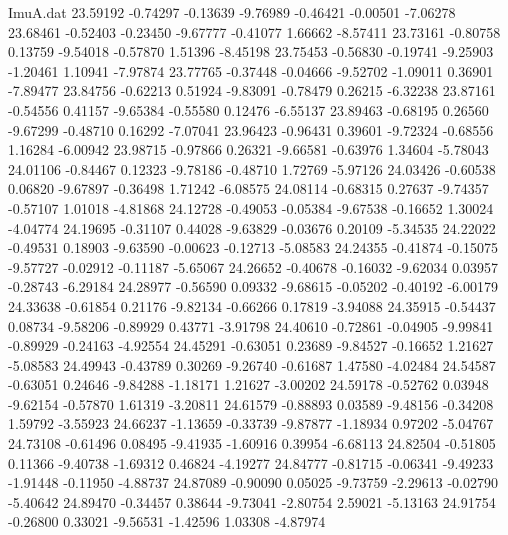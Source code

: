 \begin{filecontents}{ImuA.dat}
  23.59192   -0.74297   -0.13639   -9.76989   -0.46421   -0.00501   -7.06278
  23.68461   -0.52403   -0.23450   -9.67777   -0.41077    1.66662   -8.57411
  23.73161   -0.80758    0.13759   -9.54018   -0.57870    1.51396   -8.45198
  23.75453   -0.56830   -0.19741   -9.25903   -1.20461    1.10941   -7.97874
  23.77765   -0.37448   -0.04666   -9.52702   -1.09011    0.36901   -7.89477
  23.84756   -0.62213    0.51924   -9.83091   -0.78479    0.26215   -6.32238
  23.87161   -0.54556    0.41157   -9.65384   -0.55580    0.12476   -6.55137
  23.89463   -0.68195    0.26560   -9.67299   -0.48710    0.16292   -7.07041
  23.96423   -0.96431    0.39601   -9.72324   -0.68556    1.16284   -6.00942
  23.98715   -0.97866    0.26321   -9.66581   -0.63976    1.34604   -5.78043
  24.01106   -0.84467    0.12323   -9.78186   -0.48710    1.72769   -5.97126
  24.03426   -0.60538    0.06820   -9.67897   -0.36498    1.71242   -6.08575
  24.08114   -0.68315    0.27637   -9.74357   -0.57107    1.01018   -4.81868
  24.12728   -0.49053   -0.05384   -9.67538   -0.16652    1.30024   -4.04774
  24.19695   -0.31107    0.44028   -9.63829   -0.03676    0.20109   -5.34535
  24.22022   -0.49531    0.18903   -9.63590   -0.00623   -0.12713   -5.08583
  24.24355   -0.41874   -0.15075   -9.57727   -0.02912   -0.11187   -5.65067
  24.26652   -0.40678   -0.16032   -9.62034    0.03957   -0.28743   -6.29184
  24.28977   -0.56590    0.09332   -9.68615   -0.05202   -0.40192   -6.00179
  24.33638   -0.61854    0.21176   -9.82134   -0.66266    0.17819   -3.94088
  24.35915   -0.54437    0.08734   -9.58206   -0.89929    0.43771   -3.91798
  24.40610   -0.72861   -0.04905   -9.99841   -0.89929   -0.24163   -4.92554
  24.45291   -0.63051    0.23689   -9.84527   -0.16652    1.21627   -5.08583
  24.49943   -0.43789    0.30269   -9.26740   -0.61687    1.47580   -4.02484
  24.54587   -0.63051    0.24646   -9.84288   -1.18171    1.21627   -3.00202
  24.59178   -0.52762    0.03948   -9.62154   -0.57870    1.61319   -3.20811
  24.61579   -0.88893    0.03589   -9.48156   -0.34208    1.59792   -3.55923
  24.66237   -1.13659   -0.33739   -9.87877   -1.18934    0.97202   -5.04767
  24.73108   -0.61496    0.08495   -9.41935   -1.60916    0.39954   -6.68113
  24.82504   -0.51805    0.11366   -9.40738   -1.69312    0.46824   -4.19277
  24.84777   -0.81715   -0.06341   -9.49233   -1.91448   -0.11950   -4.88737
  24.87089   -0.90090    0.05025   -9.73759   -2.29613   -0.02790   -5.40642
  24.89470   -0.34457    0.38644   -9.73041   -2.80754    2.59021   -5.13163
  24.91754   -0.26800    0.33021   -9.56531   -1.42596    1.03308   -4.87974

\end{filecontents}
